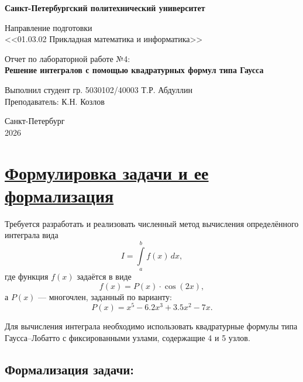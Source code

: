 \documentclass[14pt]{extarticle}
\begin{document}
	
	\thispagestyle{empty}
	
	\begin{center}
		
		\textbf{Санкт-Петербургский политехнический университет}\\
		\vspace{2cm}
		
		Направление подготовки \\
		\large <<01.03.02 Прикладная математика и информатика>>\\
		
		\vspace{7cm}
		
		Отчет по лабораторной работе №4:\\
		\vspace{0.2cm}
		\textbf{\LARGE Решение интегралов с помощью квадратурных формул типа Гаусса}
		
		\vspace{6cm}
		
		\begin{flushleft}
			Выполнил студент гр. 5030102/40003 \hfill Т.Р. Абдуллин\\
			Преподаватель: \hfill К.Н. Козлов\\
		\end{flushleft}
		
		\vspace{3cm}
		
		Санкт-Петербург\\
		2026
	\end{center}
	
	
	\tableofcontents
	\newpage
	\section{\Large \underline{Формулировка задачи и ее формализация}}
	Требуется разработать и реализовать численный метод вычисления определённого интеграла вида
	\[
	I = \int\limits_a^b f(x)\,dx,
	\]
	где функция $f(x)$ задаётся в виде
	\[
	f(x) = P(x)\cdot \cos(2x),
	\]
	а $P(x)$ — многочлен, заданный по варианту:
	\[
	P(x) = x^5 - 6.2x^3 + 3.5x^2 - 7x.
	\]
	
	Для вычисления интеграла необходимо использовать квадратурные формулы типа Гаусса–Лобатто с фиксированными узлами, содержащие 4 и 5 узлов.
	
	\subsection{Формализация задачи:}
	
\end{document}
